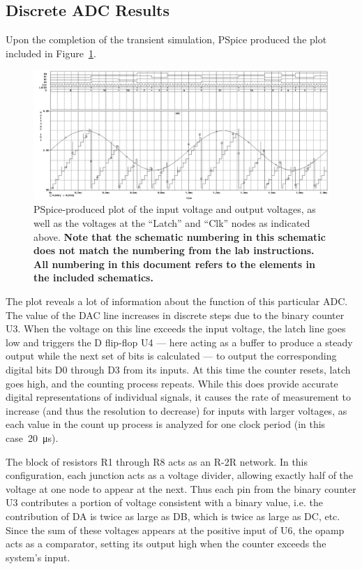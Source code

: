 \subsection{Discrete ADC Results}
Upon the completion of the transient simulation, PSpice produced the plot
included in Figure~\ref{f:adc_plot}.
%
\begin{figure}[H]
\centering
	\includegraphics[width=.8\textwidth]{img/plot/part2_plot.PNG}
	\parbox{.8\textwidth}{
	\caption[Discrete ADC --- Results]{PSpice-produced plot of the input
	voltage and output voltages, as well as the voltages at the ``Latch'' and
	``Clk'' nodes as indicated above.  \textbf{Note that the schematic
	numbering in this schematic does not match the numbering from the lab
	instructions.  All numbering in this document refers to the elements in the
	included schematics.}}
	\label{f:adc_plot}}
\end{figure}
%
The plot reveals a lot of information about the function of this particular
ADC.  The value of the DAC line increases in discrete steps due to the binary
counter U3.  When the voltage on this line exceeds the input voltage, the latch
line goes low and triggers the D flip-flop U4 --- here acting as a buffer to
produce a steady output while the next set of bits is calculated --- to output
the corresponding digital bits D0 through D3 from its inputs.  At this time the
counter resets, latch goes high, and the counting process repeats.  While this
does provide accurate digital representations of individual signals, it causes
the rate of measurement to increase (and thus the resolution to decrease) for
inputs with larger voltages, as each value in the count up process is analyzed
for one clock period (in this case~\SI{20}{\micro\second}).

The block of resistors R1 through R8 acts as an R-2R network.  In this
configuration, each junction acts as a voltage divider, allowing exactly
half of the voltage at one node to appear at the next.  Thus each pin from the
binary counter U3 contributes a portion of voltage consistent with a binary
value,  i.e. the contribution of DA is twice as large as DB, which is twice as
large as DC, etc.  Since the sum of these voltages appears at the positive
input of U6, the opamp acts as a comparator, setting its output high when the
counter exceeds the system's input.

